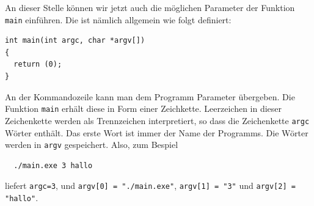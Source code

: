 An dieser Stelle können wir jetzt auch die möglichen Parameter der Funktion \verb|main| einführen.
Die ist nämlich allgemein wie folgt definiert:
\begin{lstlisting}
int main(int argc, char *argv[])
{
  return (0);
}
\end{lstlisting}
An der Kommandozeile kann man dem Programm Parameter übergeben.
Die Funktion \verb|main| erhält diese in Form einer Zeichkette.
Leerzeichen in dieser Zeichenkette werden als Trennzeichen interpretiert, so dass die Zeichenkette \verb|argc| Wörter enthält.
Das erste Wort ist immer der Name der Programms.
Die Wörter werden in \verb|argv| gespeichert.
Also, zum Bespiel
\begin{verbatim}
  ./main.exe 3 hallo
\end{verbatim}
liefert \verb|argc=3|, und \verb|argv[0] = "./main.exe"|, \verb|argv[1] = "3"| und \verb|argv[2] = "hallo"|.
\newpage
